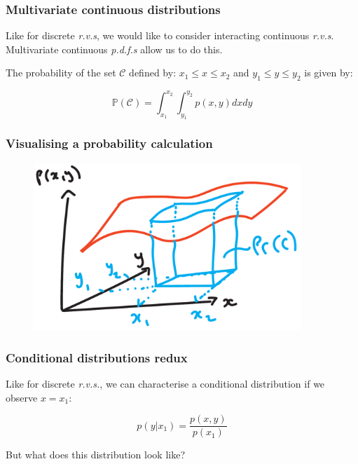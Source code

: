 \documentclass{beamer}
\begin{document}
	\begin{frame}
		\frametitle{Multivariate continuous distributions}
		
		Like for discrete \textit{r.v.s}, we would like to consider interacting continuous \textit{r.v.s}. Multivariate continuous \textit{p.d.f.s} allow us to do this.
		
		\vspace{0.5cm}
		
		The probability of the set $\mathcal{C}$ defined by: $x_1 \leq x \leq x_2$ and $y_1 \leq y \leq y_2$ is given by: 
		
		\begin{equation}
		 \mathbb{P}(\mathcal{C}) = \int_{x_1}^{x_2}\int_{y_1}^{y_2} p(x, y)dx dy
		\end{equation}
		
	\end{frame}
	
	\begin{frame}
		\frametitle{Visualising a probability calculation}
		
		\begin{figure}[ht]
			\centerline{\includegraphics[width=0.9\textwidth]{./figures/multivariate_continuous_volume.pdf}}
		\end{figure}
		
	\end{frame}
	
	\begin{frame}
		\frametitle{Conditional distributions redux}
		
		Like for discrete \textit{r.v.s.}, we can characterise a conditional distribution if we observe $x=x_1$:
		
		\begin{equation}
		p(y|x_1) = \frac{p(x, y)}{p(x_1)}
		\end{equation}
		
		But what does this distribution look like?
		
	\end{frame}
	
\end{document}
